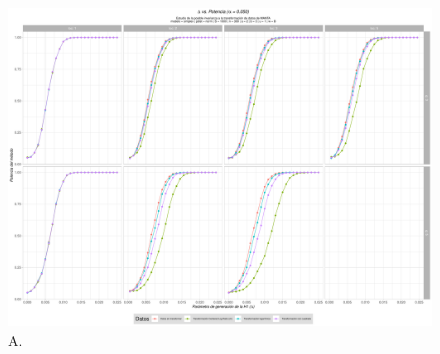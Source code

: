 \documentclass[IB,BIB]{TFUOC}%
\begin{document}
\begin{figure}[!htbp]
\hspace*{-0.8cm} %
    \centering
    \includegraphics[scale=.45]{OBJ2SimplexMANTAqloc005.pdf}
    \caption{\scriptsize{A.}}
    \label{figAppend:OBJ2SimplexMANTAqloc005}
\end{figure}
\end{document}

